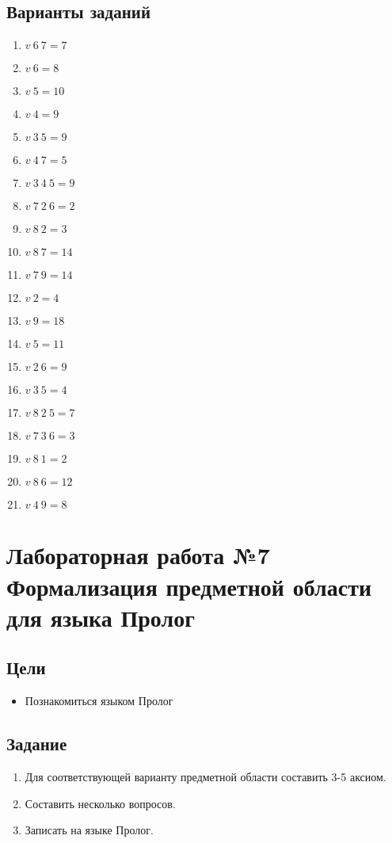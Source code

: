 \documentclass[a4paper,12pt]{article}
\begin{document}
\subsection{Варианты заданий}
\begin{enumerate}
	\item $v\ 6\ 7 = 7$
	\item $v\ 6 = 8$
	\item $v\ 5 = 10$
	\item $v\ 4 = 9$
	\item $v\ 3\ 5 = 9$
	\item $v\ 4\ 7 = 5$
	\item $v\ 3\ 4\ 5 = 9$
	\item $v\ 7\ 2\ 6 = 2$
	\item $v\ 8\ 2 = 3$
	\item $v\ 8\ 7 = 14$
	\item $v\ 7\ 9 = 14$
	\item $v\ 2 = 4$
	\item $v\ 9 = 18$
	\item $v\ 5 = 11$
	\item $v\ 2\ 6 = 9$
	\item $v\ 3\ 5 = 4$
	\item $v\ 8\ 2\ 5 = 7$
	\item $v\ 7\ 3\ 6 = 3$
	\item $v\ 8\ 1 = 2$
	\item $v\ 8\ 6 = 12$
	\item $v\ 4\ 9 = 8$
\end{enumerate}

\newpage
\section{Лабораторная работа №7 \\ 
	Формализация предметной области для языка Пролог}
\subsection{Цели}
\begin{itemize}
	\item Познакомиться языком Пролог
\end{itemize}

\subsection{Задание}
\begin{enumerate}
	\item Для соответствующей варианту предметной области составить 3-5 аксиом.
	\item Составить несколько вопросов.
	\item Записать на языке Пролог.
\end{enumerate}
\end{document}
